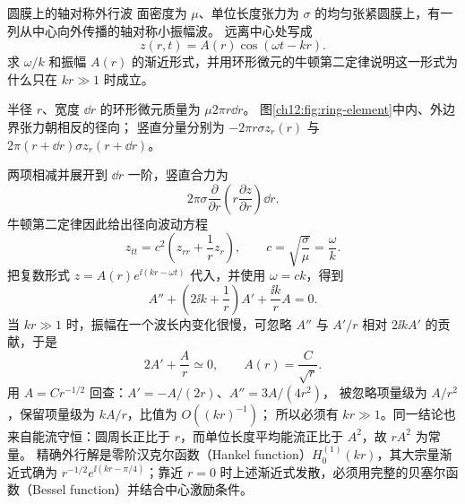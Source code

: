\begin{origexamplebox}{圆膜上的轴对称外行波}
\label{ch12:ex:11}
面密度为 $\mu$、单位长度张力为 $\sigma$ 的均匀张紧圆膜上，有一列从中心向外传播的轴对称小振幅波。
远离中心处写成
\[
 z(r,t)=A(r)\cos(\omega t-kr).
\]
求 $\omega/k$ 和振幅 $A(r)$ 的渐近形式，并用环形微元的牛顿第二定律说明这一形式为什么只在 $kr\gg1$ 时成立。

\ThQMembrane
\end{origexamplebox}
\begin{xesolution}
半径 $r$、宽度 $\dd r$ 的环形微元质量为 $\mu2\pi r\dd r$。
图\ref{ch12:fig:ring-element}中内、外边界张力朝相反的径向；
竖直分量分别为 $-2\pi r\sigma z_r(r)$ 与 $2\pi(r+\dd r)\sigma z_r(r+\dd r)$。
\begin{center}\begin{minipage}{\linewidth}\centering
{}
\label{ch12:fig:ring-element}
\end{minipage}\end{center}
两项相减并展开到 $\dd r$ 一阶，竖直合力为
\[
 2\pi\sigma\frac{\partial}{\partial r}
 \left(r\frac{\partial z}{\partial r}\right)\dd r.
\]
牛顿第二定律因此给出径向波动方程
\[
 z_{tt}=c^2\left(z_{rr}+\frac1r z_r\right),
 \qquad
 \boxed{c=\sqrt{\frac\sigma\mu}=\frac\omega k}.
\]
把复数形式 $z=A(r)e^{\ii(kr-\omega t)}$ 代入，并使用 $\omega=ck$，得到
\[
 A''+\left(2\ii k+\frac1r\right)A'
 +\frac{\ii k}{r}A=0.
\]
当 $kr\gg1$ 时，振幅在一个波长内变化很慢，可忽略 $A''$ 与 $A'/r$ 相对 $2\ii kA'$ 的贡献，于是
\[
 2A'+\frac Ar\simeq0,
 \qquad
 \boxed{A(r)=\frac{C}{\sqrt r}}.
\]
用 $A=C r^{-1/2}$ 回查：$A'=-A/(2r)$、$A''=3A/(4r^2)$，
被忽略项量级为 $A/r^2$，保留项量级为 $kA/r$，比值为 $O((kr)^{-1})$；
所以必须有 $kr\gg1$。同一结论也来自能流守恒：圆周长正比于 $r$，而单位长度平均能流正比于 $A^2$，故 $rA^2$ 为常量。
精确外行解是零阶汉克尔函数（Hankel function）$H_0^{(1)}(kr)$，其大宗量渐近式确为
$r^{-1/2}e^{\ii(kr-\pi/4)}$；靠近 $r=0$ 时上述渐近式发散，必须用完整的贝塞尔函数（Bessel function）并结合中心激励条件。
\end{xesolution}

